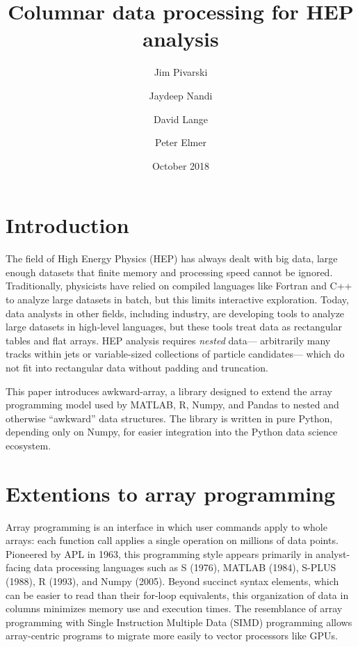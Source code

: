 \documentclass{webofc}
\title{Columnar data processing for HEP analysis}
\author{Jim Pivarski\inst{1} \and Jaydeep Nandi\inst{2} \and David Lange\inst{1} \and Peter Elmer\inst{1}}
\date{October 2018}
\begin{document}

\maketitle

\section{Introduction}

The field of High Energy Physics (HEP) has always dealt with big data, large enough datasets that finite memory and processing speed cannot be ignored. Traditionally, physicists have relied on compiled languages like Fortran and C++ to analyze large datasets in batch, but this limits interactive exploration. Today, data analysts in other fields, including industry, are developing tools to analyze large datasets in high-level languages, but these tools treat data as rectangular tables and flat arrays. HEP analysis requires {\it nested} data--- arbitrarily many tracks within jets or variable-sized collections of particle candidates--- which do not fit into rectangular data without padding and truncation.

This paper introduces awkward-array, a library designed to extend the array programming model used by MATLAB, R, Numpy, and Pandas to nested and otherwise ``awkward'' data structures. The library is written in pure Python, depending only on Numpy, for easier integration into the Python data science ecosystem.

\section{Extentions to array programming}

Array programming is an interface in which user commands apply to whole arrays: each function call applies a single operation on millions of data points. Pioneered by APL in 1963, this programming style appears primarily in analyst-facing data processing languages such as S (1976), MATLAB (1984), S-PLUS (1988), R (1993), and Numpy (2005). Beyond succinct syntax elements, which can be easier to read than their for-loop equivalents, this organization of data in columns minimizes memory use and execution times. The resemblance of array programming with Single Instruction Multiple Data (SIMD) programming allows array-centric programs to migrate more easily to vector processors like GPUs.
\end{document}
